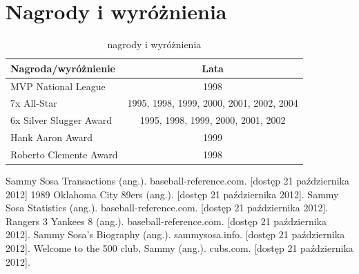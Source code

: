 \documentclass[a4paper,12pt]{article}
\begin{document}
\section{Nagrody i wyróżnienia}
\begin{table}[h]
	\begin{tabular}{lc}
	\textbf{Nagroda/wyróżnienie}&\textbf{Lata}\\
	\hline
	MVP National League&1998\\
	7x All-Star&1995, 1998, 1999, 2000, 2001, 2002, 2004\\
	6x Silver Slugger Award&1995, 1998, 1999, 2000, 2001, 2002\\
	Hank Aaron Award&1999\\
	Roberto Clemente Award&1998\\
	\hline
	\end{tabular}
\caption{nagrody i wyróżnienia}
\end{table}
\newpage
\begin{thebibliography}{6}
\bibitem{}Sammy Sosa Transactions (ang.). baseball-reference.com. [dostęp 21 października 2012]
\bibitem{}1989 Oklahoma City 89ers (ang.). [dostęp 21 października 2012].
\bibitem{}Sammy Sosa Statistics (ang.). baseball-reference.com. [dostęp 21 października 2012].
\bibitem{}Rangers 3 Yankees 8 (ang.). baseball-reference.com. [dostęp 21 października 2012].
\bibitem{}Sammy Sosa's Biography (ang.). sammysosa.info. [dostęp 21 października 2012].
\bibitem{}Welcome to the 500 club, Sammy (ang.). cubs.com. [dostęp 21 października 2012].
\end{thebibliography}
\end{document}

